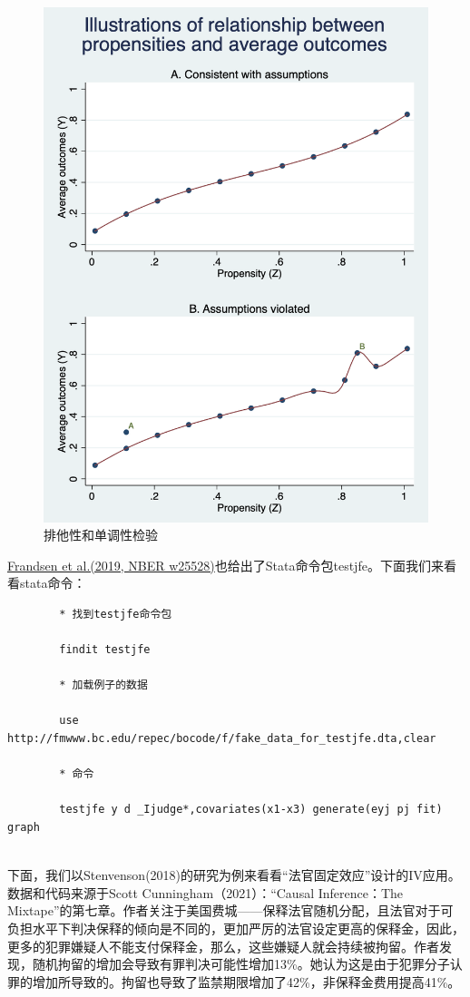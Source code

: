 \documentclass[cn,12pt,math=newtx,citestyle=gb7714-2015,bibstyle=gb7714-2015]{elegantbook}
\begin{document}
	\begin{figure}[tbph]
		\centering
		\includegraphics[width=0.8\linewidth]{jfe}
		\caption{排他性和单调性检验}
		\label{fig:jfe}
	\end{figure}
	
	\href{https://www.nber.org/system/files/working_papers/w25528/w25528.pdf}{Frandsen et al.(2019, NBER w25528)}也给出了Stata命令包testjfe。下面我们来看看stata命令：
	
	\begin{lstlisting}
		* 找到testjfe命令包
		
		findit testjfe
		
		* 加载例子的数据
		
		use http://fmwww.bc.edu/repec/bocode/f/fake_data_for_testjfe.dta,clear
		
		* 命令
		
		testjfe y d _Ijudge*,covariates(x1-x3) generate(eyj pj fit) graph
		
	\end{lstlisting}
	
	下面，我们以Stenvenson(2018)的研究为例来看看“法官固定效应”设计的IV应用。数据和代码来源于Scott Cunningham（2021）：“Causal Inference：The Mixtape”的第七章。作者关注于美国费城——保释法官随机分配，且法官对于可负担水平下判决保释的倾向是不同的，更加严厉的法官设定更高的保释金，因此，更多的犯罪嫌疑人不能支付保释金，那么，这些嫌疑人就会持续被拘留。作者发现，随机拘留的增加会导致有罪判决可能性增加13\%。她认为这是由于犯罪分子认罪的增加所导致的。拘留也导致了监禁期限增加了42\%，非保释金费用提高41\%。
	
\end{document}

